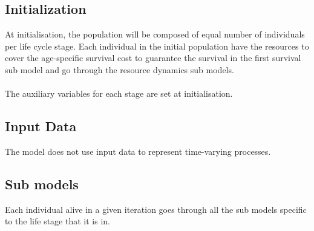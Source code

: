 \documentclass{article}
\begin{document}
\subsection{Initialization}

At initialisation, the population will be composed of equal number of individuals per life cycle stage. Each individual in the initial population have the resources to cover the age-specific survival cost to guarantee the survival in the first survival sub model and go through the resource dynamics sub models.
\\\\
The auxiliary variables for each stage are set at initialisation.

\subsection{Input Data}

The model does not use input data to represent time-varying processes.

\subsection{Sub models}

Each individual alive in a given iteration goes through all the sub models specific to the life stage that it is in.
\end{document}
